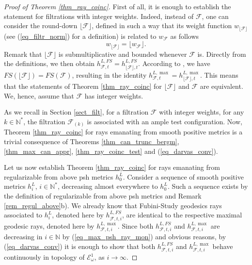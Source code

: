 \documentclass[12pt]{article}
\numberwithin{equation}{section}
\theoremstyle{theorem}
\theoremstyle{definition}
\theoremstyle{remark}
\newcommand{\nat}{\mathbb{N}}
\begin{document}
	\begin{proof}[Proof of Theorem \ref{thm_ray_coinc}]
		First of all, it is enough to establish the statement for filtrations with integer weights.
		Indeed, instead of $\mathcal{F}$, one can consider the round-down $\lfloor \mathcal{F} \rfloor$, defined in such a way that its weight function $w_{\lfloor \mathcal{F} \rfloor}$ (see (\ref{eq_filtr_norm}) for a definition) is related to $w_{\mathcal{F}}$ as follows
		\begin{equation}
			w_{\lfloor \mathcal{F} \rfloor} = \lfloor w_{\mathcal{F}} \rfloor.
		\end{equation}
		Remark that $\lfloor \mathcal{F} \rfloor$ is submultiplicative and bounded whenever $\mathcal{F}$ is.
		Directly from the definitions, we then obtain $h^{L, FS}_{\mathcal{F}, t} = h^{L, FS}_{\lfloor \mathcal{F} \rfloor, t}$.
		According to \cite[Example 1.7]{BouckJohn21}, we have $FS(\lfloor \mathcal{F} \rfloor) = FS(\mathcal{F})$, resulting in the identity $h^{L, \max}_{\mathcal{F}, t} = h^{L, \max}_{\lfloor \mathcal{F} \rfloor, t}$.
		This means that the statements of Theorem \ref{thm_ray_coinc} for $\lfloor \mathcal{F} \rfloor$ and $\mathcal{F}$ are equivalent.
		We, hence, assume that $\mathcal{F}$ has integer weights.
		\par 
		As we recall in Section \ref{sect_filt}, for a filtration $\mathcal{F}$ with integer weights, for any $k \in \nat^*$, the filtration $\mathcal{F}_{(k)}$ is associated with an ample test configuration.
		Now, Theorem \ref{thm_ray_coinc} for rays emanating from smooth positive metrics is a trivial consequence of Theorems \ref{thm_can_trunc_bergm}, \ref{thm_max_can_appr}, \ref{thm_ray_coinc_test} and (\ref{eq_darvas_conv}).
		\par 
		Let us now establish Theorem \ref{thm_ray_coinc} for rays emanating from regularizable from above psh metrics $h^L_0$.
		Consider a sequence of smooth positive metrics $h^L_i$, $i \in \nat^*$, decreasing almost everywhere to $h^L_0$.
		 Such a sequence exists by the definition of regularizable from above psh metrics and Remark \ref{rem_regul_above}b).
		 We already know that Fubini-Study geodesics rays associated to $h^L_i$, denoted here by $h^{L, FS}_{\mathcal{F}, t, i}$, are identical to the respective maximal geodesic rays, denoted here by $h^{L, \max}_{\mathcal{F}, t, i}$. 
		 Since both  $h^{L, FS}_{\mathcal{F}, t, i}$ and $h^{L, \max}_{\mathcal{F}, t, i}$ are decreasing in $i \in \nat$ by (\ref{eq_max_psh_ray_mon}) and obvious reasons, by (\ref{eq_darvas_conv}) it is enough to show that both $h^{L, FS}_{\mathcal{F}, t, i}$ and $h^{L, \max}_{\mathcal{F}, t, i}$ behave continuously in topology of $\mathcal{E}_{\omega}^1$, as $i \to \infty$.

\end{proof}
\end{document}
